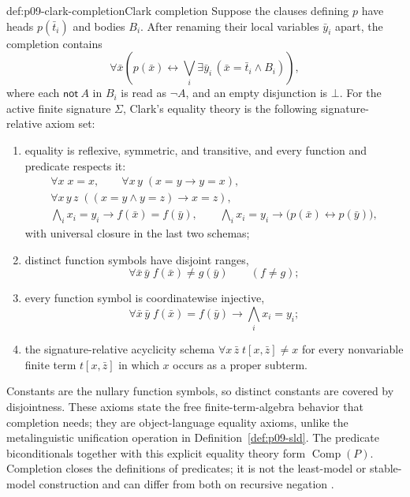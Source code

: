 \begin{hbdefinition}{def:p09-clark-completion}{Clark completion}
Suppose the clauses defining \(p\) have heads
\(p(\bar t_i)\) and bodies \(B_i\).  After renaming their local variables
\(\bar y_i\) apart, the completion contains
\[
 \forall\bar x\left(
 p(\bar x)\leftrightarrow
 \bigvee_i\exists\bar y_i\,
   (\bar x=\bar t_i\land B_i)
 \right),
\]
where each \(\mathsf{not}\ A\) in \(B_i\) is read as \(\neg A\), and an empty
disjunction is \(\bot\).  For the active finite signature \(\Sigma\), Clark's
equality theory is the following signature-relative axiom set:
\begin{enumerate}
\item equality is reflexive, symmetric, and transitive, and every function and
predicate respects it:
\[
\begin{gathered}
 \forall x\;x=x,\qquad
 \forall x\,y\;(x=y\to y=x),\\
 \forall x\,y\,z\;((x=y\land y=z)\to x=z),\\
 \bigwedge_i x_i=y_i\to f(\bar x)=f(\bar y),\qquad
 \bigwedge_i x_i=y_i\to
   \bigl(p(\bar x)\leftrightarrow p(\bar y)\bigr),
\end{gathered}
\]
with universal closure in the last two schemas;
\item distinct function symbols have disjoint ranges,
\[
 \forall\bar x\,\bar y\;f(\bar x)\ne g(\bar y)\qquad(f\ne g);
\]
\item every function symbol is coordinatewise injective,
\[
 \forall\bar x\,\bar y\;
 f(\bar x)=f(\bar y)\to\bigwedge_i x_i=y_i;
\]
\item the signature-relative acyclicity schema
\(\forall x\,\bar z\;t[x,\bar z]\ne x\) for every nonvariable finite term
\(t[x,\bar z]\) in which \(x\) occurs as a proper subterm.
\end{enumerate}
Constants are the nullary function symbols, so distinct constants are covered
by disjointness.  These axioms state the free finite-term-algebra behavior that
completion needs; they are object-language equality axioms, unlike the
metalinguistic unification operation in Definition~\ref{def:p09-sld}.  The
predicate biconditionals together with this explicit equality theory form
\(\operatorname{Comp}(P)\).  Completion closes the
definitions of predicates; it is not the least-model or stable-model
construction and can differ from both on recursive negation
\cite{Clark1978}.
\end{hbdefinition}

